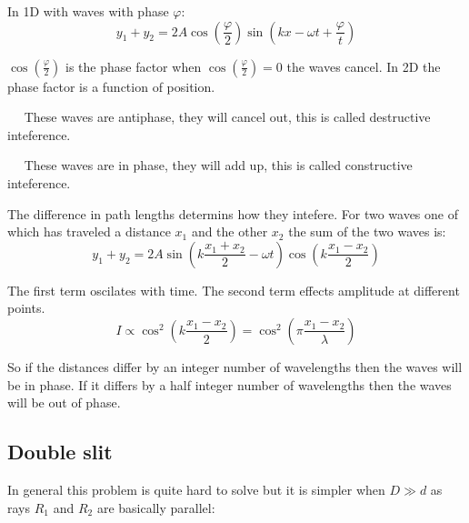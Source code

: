 In 1D with waves with phase \(\varphi\):
\[y_1+y_2=2A\cos\left(\frac{\varphi}{2}\right)\sin\left(kx-\omega t+\frac{\varphi}{t}\right)\]

\(\cos\left(\frac{\varphi}{2}\right)\) is the phase factor when \(\cos\left(\frac{\varphi}{2}\right)=0\) the waves cancel. In 2D the phase factor is a function of position.

~ ~These waves are antiphase, they will cancel out, this is called destructive inteference.

~ ~These waves are in phase, they will add up, this is called constructive inteference.

The difference in path lengths determins how they intefere. For two waves one of which has traveled a distance \(x_1\) and the other \(x_2\) the sum of the two waves is:
\[y_1+y_2=2A\sin\left(k\frac{x_1+x_2}{2}-\omega t\right)\cos\left(k\frac{x_1-x_2}{2}\right)\]

The first term oscilates with time. The second term effects amplitude at different points.
\[I\propto \cos^2\left(k\frac{x_1-x_2}{2}\right)=\cos^2\left(\pi\frac{x_1-x_2}{\lambda}\right)\]

So if the distances differ by an integer number of wavelengths then the waves will be in phase. If it differs by a half integer number of wavelengths then the waves will be out of phase.

\subsection*{Double slit}

\begin{center}
\end{center}

In general this problem is quite hard to solve but it is simpler when \(D\gg d\) as rays \(R_1\) and \(R_2\) are basically parallel:

